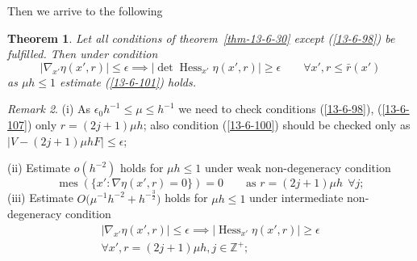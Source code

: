 \documentclass[12pt,oneside,openany,article]{memoir}
\numberwithin{equation}{chapter}
\theoremstyle{plain}
\newtheorem{theorem}{Theorem}[chapter]
\theoremstyle{definition}
\theoremstyle{remark}
\newtheorem{remark}[theorem]{Remark}
\numberwithin{equation}{chapter}
\begin{document}
Then we arrive to the following 

\begin{theorem}\label{thm-13-6-32}
Let all conditions of theorem~\ref{thm-13-6-30} except \textup{(\ref{13-6-98})} be fulfilled. Then under condition
\begin{equation}
|\nabla_{x'} \eta (x',r)|\le \epsilon \implies |\det {\operatorname{Hess}}_{x'} \eta (x',r) |\ge \epsilon \qquad
\forall x', r\le \bar{r}(x')
\label{13-6-107}
\end{equation}
as $\mu h\le 1$ estimate \textup{(\ref{13-6-101})} holds.
\end{theorem}

\begin{remark}\label{remark-13-6-33}
(i) As $\epsilon_0 h^{-1}\le \mu \le h^{-1}$ we need to check conditions (\ref{13-6-98}), (\ref{13-6-107}) only $r= (2j+1)\mu h $; also condition (\ref{13-6-100}) should be checked only as $|V- (2j+1)\mu h F|\le \epsilon$; 

\medskip\noindent
(ii) Estimate $o(h^{-2})$ holds for  $\mu h \le 1$ under weak non-degeneracy condition
\begin{equation}
{\operatorname{mes}} (\{x': \nabla \eta (x', r) =0\})=0\qquad \text{as\ \ }r=(2j+1)\mu h\ \ \forall j;
\label{13-6-108}
\end{equation}
(iii) Estimate $O\bigl(\mu^{-1}h^{-2}+h^{-\frac{3}{2}}\bigr)$ holds for  
$\mu h \le 1$ under intermediate non-degeneracy condition
\begin{multline}
|\nabla_{x'} \eta (x', r)  |\le \epsilon \implies | {\operatorname{Hess}}_{x'} \eta (x',r) |\ge \epsilon \\
\forall x', r=(2j+1)\mu h, j\in {{\mathbb{Z}}}^+;
\label{13-6-109}
\end{multline}
\end{remark}
\end{document}

